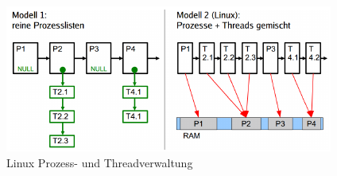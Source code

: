 \begin{figure}[ht!]
    \includegraphics[scale=.8]{pics/linux_ps_th}
    \caption{Linux Prozess- und Threadverwaltung}
\end{figure}
